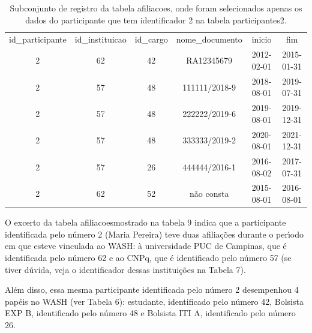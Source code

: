 \documentclass[
12pt,		%
openright,	%
twoside,  %
a4paper,			%
chapter=TITLE,		%
english,			%
french,				%
spanish,			%
brazil				%
]{USPSC-classe/USPSC}
\begin{document}
\begin{table}[htb]
\tiny
\caption{\label{e6120545268b93238330297571c4756e7c97df1a}Subconjunto de registro da tabela afiliacoes, onde foram selecionados apenas os dados do participante que tem identificador 2 na tabela participantes2.}

\centering
\begin{tabular}{|c|c|c|c|c|c|}
\hline
id\_participante  &  id\_instituicao  &  id\_cargo  &  nome\_documento  &  inicio      &  fim \\
              2  &              62  &        42  &  RA12345679      &  2012-02-01  &  2015-01-31  \\
              2  &              57  &        48  &  111111/2018-9   &  2018-08-01  &  2019-07-31  \\
              2  &              57  &        48  &  222222/2019-6   &  2019-08-01  &  2019-12-31  \\
              2  &              57  &        48  &  333333/2019-2   &  2020-08-01  &  2021-12-31  \\
              2  &              57  &        26  &  444444/2016-1   &  2016-08-02  &  2017-07-31  \\
              2  &              62  &        52  &  n\~ao consta      &  2015-08-01  &  2016-08-01 \\
\hline
\end{tabular}
\end{table}


O excerto da tabela \textquotedbl afiliacoes\textquotedbl  mostrado na tabela 9 indica que a participante identificada pelo n\'umero 2 (Maria Pereira)  teve duas afilia\c{c}\~oes durante o per\'{\i}odo em que esteve vinculada ao WASH: \`a universidade PUC de Campinas, que \'e identificada pelo n\'umero 62 e ao CNPq, que \'e identificado pelo n\'umero 57 (se tiver d\'uvida, veja o identificador dessas institui\c{c}\~oes na Tabela 7).









Al\'em disso, essa mesma participante identificada pelo n\'umero 2 desempenhou 4 pap\'eis no WASH (ver Tabela 6): estudante, identificado pelo n\'umero 42, Bolsista EXP B, identificado pelo n\'umero 48 e Bolsista ITI A, identificado pelo n\'umero 26.
\end{document}
